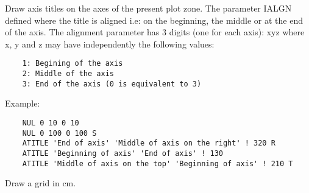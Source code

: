 
\BEGARG
{}
\ENDARG
{}
\ENDOPT

   \par
Draw axis titles on the axes of the present plot zone.  The parameter IALGN 
   defined where the title is aligned i.e:  on the beginning, the middle or at 
   the end of the axis. The alignment parameter has 3 digits (one for each 
   axis): xyz where x, y and z may have independently the following values:  
\begin{verbatim}
    1: Begining of the axis
    2: Middle of the axis
    3: End of the axis (0 is equivalent to 3)
\end{verbatim}
   \par
Example:  
\begin{verbatim}
    NUL 0 10 0 10
    NUL 0 100 0 100 S
    ATITLE 'End of axis' 'Middle of axis on the right' ! 320 R
    ATITLE 'Beginning of axis' 'End of axis' ! 130
    ATITLE 'Middle of axis on the top' 'Beginning of axis' ! 210 T
\end{verbatim}

\ENDCMD


   \par
Draw a grid in cm.  

\ENDCMD


\BEGARG
{}
\ENDARG
{}
\ENDOPT

